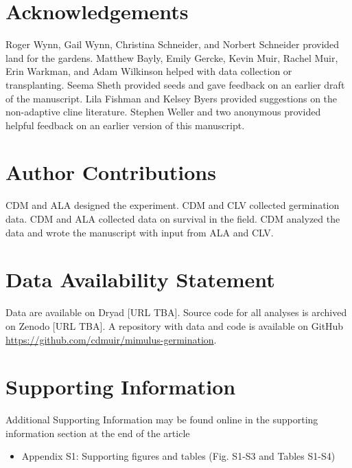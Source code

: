 \documentclass[
  12pt,
]{article}
\providecommand{\tightlist}{%
  \setlength{\itemsep}{0pt}\setlength{\parskip}{0pt}}
\begin{document}
\hypertarget{acknowledgements}{%
\section{Acknowledgements}\label{acknowledgements}}

Roger Wynn, Gail Wynn, Christina Schneider, and Norbert Schneider provided land for the gardens. Matthew Bayly, Emily Gercke, Kevin Muir, Rachel Muir, Erin Warkman, and Adam Wilkinson helped with data collection or transplanting. Seema Sheth provided seeds and gave feedback on an earlier draft of the manuscript. Lila Fishman and Kelsey Byers provided suggestions on the non-adaptive cline literature. Stephen Weller and two anonymous provided helpful feedback on an earlier version of this manuscript.

\hypertarget{author-contributions}{%
\section{Author Contributions}\label{author-contributions}}

CDM and ALA designed the experiment. CDM and CLV collected germination data. CDM and ALA collected data on survival in the field. CDM analyzed the data and wrote the manuscript with input from ALA and CLV.

\hypertarget{data-availability-statement}{%
\section{Data Availability Statement}\label{data-availability-statement}}

Data are available on Dryad {[}URL TBA{]}. Source code for all analyses is archived on Zenodo {[}URL TBA{]}. A repository with data and code is available on GitHub \url{https://github.com/cdmuir/mimulus-germination}.

\hypertarget{supporting-information}{%
\section{Supporting Information}\label{supporting-information}}

Additional Supporting Information may be found online in the supporting information section at the end of the article

\begin{itemize}
\tightlist
\item
  Appendix S1: Supporting figures and tables (Fig. S1-S3 and Tables S1-S4)
\end{itemize}
\end{document}
